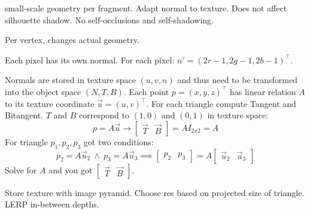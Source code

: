 \begin{definition}
  small-scale geometry per fragment.
  Adapt normal to texture.
  Does not affect silhouette shadow.
  No self-occlusions and self-shadowing.
\end{definition}

\begin{definition}
  Per vertex, changes actual geometry.
\end{definition}

\begin{definition}
  Each pixel has its own normal.
  For each pixel: \(n' = (2r - 1, 2g - 1, 2b - 1)^\top\).
\end{definition}

\begin{theorem}
  Normals are stored in texture space \((u, v, n)\) and thus need to be transformed into the object space \((N, T, B)\).
  Each point \(p = (x, y, z)^\top\) has linear relation \(A\) to its texture coordinate \(\vec{u} = (u, v)^\top\).
  For each triangle compute Tangent and Bitangent.
  \(T\) and \(B\) correspond to \((1, 0)\) and \((0, 1)\) in texture space:
  \[p = A \vec{u} \to \begin{bmatrix}
    \vec{T} & \vec{B}
  \end{bmatrix} = A I_{2 x 2} = A\]
  For triangle \(p_1, p_2, p_3\) got two conditions:
  \[p_2 = A \vec{u}_2 \ \land \ p_3 = A \vec{u}_3 \implies \begin{bmatrix}
    p_2 & p_3
  \end{bmatrix} = A \begin{bmatrix}
    \vec{u}_2 & \vec{u}_3
  \end{bmatrix}\]
  Solve for \(A\) and you got \(\begin{bmatrix}
    \vec{T} & \vec{B}
  \end{bmatrix}\).
\end{theorem}

\begin{definition}
  Store texture with image pyramid. Choose res based on projected size of triangle. LERP in-between depths.
\end{definition}
